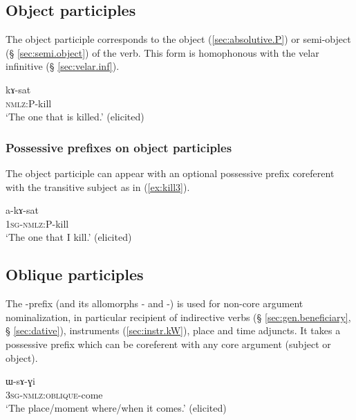 \subsection{Object participles}
The object participle corresponds to the object (\ref{sec:absolutive.P}) or semi-object (§ \ref{sec:semi.object}) of the verb. This form is homophonous with the velar infinitive (§ \ref{sec:velar.inf}).

 \begin{exe} 
\ex \label{ex:kill2}
\gll kɤ-sat    \\
   \textsc{nmlz}:P-kill \\
 \glt  `The one that is killed.' (elicited)
 \end{exe}
 
\subsubsection{Possessive prefixes on object participles}  \label{ex:object.participle.possessive} 
 
The object participle can appear with an optional possessive prefix coreferent with the transitive subject as in (\ref{ex:kill3}).
  
  \begin{exe}
\ex \label{ex:kill3}
\gll a-kɤ-sat    \\
   \textsc{1sg-nmlz}:P-kill \\
 \glt  `The one that I kill.' (elicited)
 \end{exe}

\subsection{Oblique participles}
The -prefix (and its allomorphs - and -) is used for non-core argument nominalization, in particular recipient of indirective verbs (§ \ref{sec:gen.beneficiary}, § \ref{sec:dative}), instruments (\ref{sec:instr.kW}), place and time adjuncts. It takes a possessive prefix which can be coreferent with any core argument (subject or object).

   \begin{exe}
\ex \label{ex:come}
\gll ɯ-sɤ-ɣi    \\
   \textsc{3sg-nmlz:oblique}-come \\
 \glt  `The place/moment where/when it comes.' (elicited)
 \end{exe}
 

